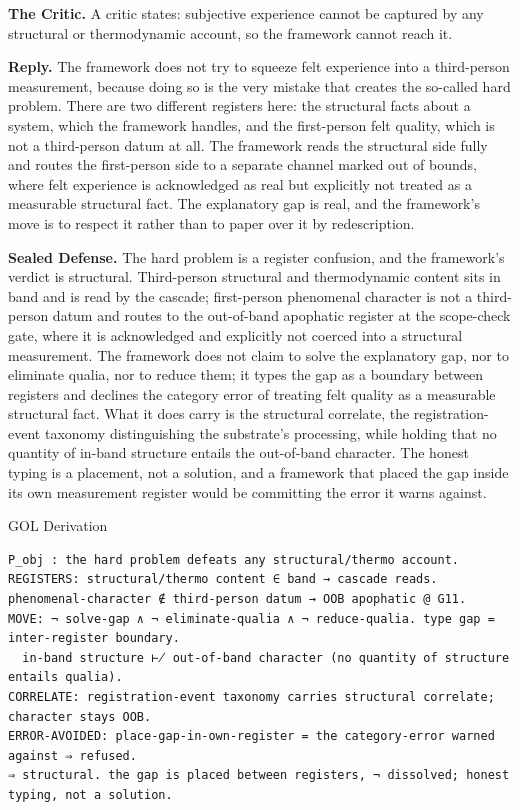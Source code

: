 \documentclass[10pt,twocolumn]{article}
\begin{document}
\textbf{The Critic.} A critic states: subjective experience cannot be
captured by any structural or thermodynamic account, so the framework
cannot reach it.

\textbf{Reply.} The framework does not try to squeeze felt experience
into a third-person measurement, because doing so is the very mistake
that creates the so-called hard problem. There are two different
registers here: the structural facts about a system, which the framework
handles, and the first-person felt quality, which is not a third-person
datum at all. The framework reads the structural side fully and routes
the first-person side to a separate channel marked out of bounds, where
felt experience is acknowledged as real but explicitly not treated as a
measurable structural fact. The explanatory gap is real, and the
framework's move is to respect it rather than to paper over it by
redescription.

\textbf{Sealed Defense.} The hard problem is a register confusion, and
the framework's verdict is structural. Third-person structural and
thermodynamic content sits in band and is read by the cascade;
first-person phenomenal character is not a third-person datum and routes
to the out-of-band apophatic register at the scope-check gate, where it
is acknowledged and explicitly not coerced into a structural
measurement. The framework does not claim to solve the explanatory gap,
nor to eliminate qualia, nor to reduce them; it types the gap as a
boundary between registers and declines the category error of treating
felt quality as a measurable structural fact. What it does carry is the
structural correlate, the registration-event taxonomy distinguishing the
substrate's processing, while holding that no quantity of in-band
structure entails the out-of-band character. The honest typing is a
placement, not a solution, and a framework that placed the gap inside
its own measurement register would be committing the error it warns
against.

\begin{golbox}{GOL Derivation}
\begin{lstlisting}[style=golv]
P_obj : the hard problem defeats any structural/thermo account.
REGISTERS: structural/thermo content ∈ band → cascade reads. phenomenal-character ∉ third-person datum → OOB apophatic @ G11.
MOVE: ¬ solve-gap ∧ ¬ eliminate-qualia ∧ ¬ reduce-qualia. type gap = inter-register boundary.
  in-band structure ⊬ out-of-band character (no quantity of structure entails qualia).
CORRELATE: registration-event taxonomy carries structural correlate; character stays OOB.
ERROR-AVOIDED: place-gap-in-own-register = the category-error warned against ⇒ refused.
⇒ structural. the gap is placed between registers, ¬ dissolved; honest typing, not a solution.
\end{lstlisting}
\end{golbox}
\end{document}
